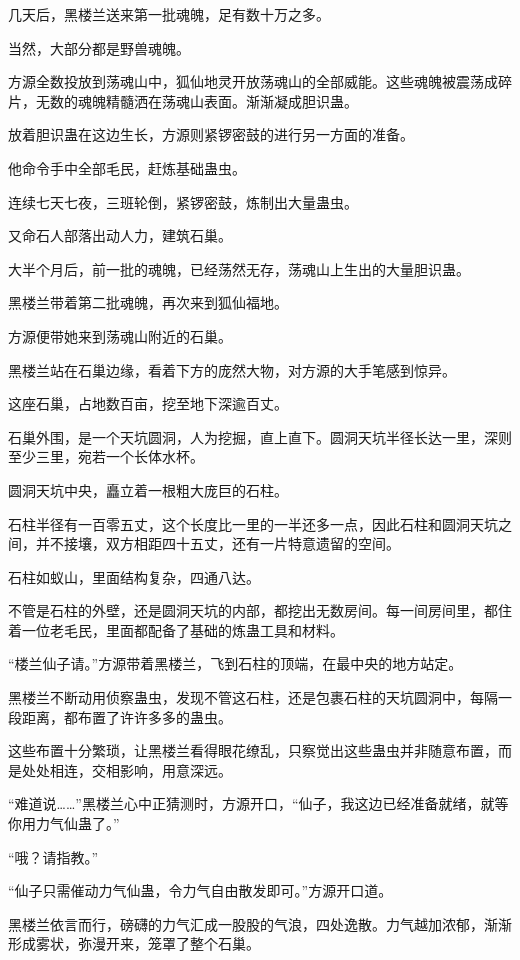\begin{this_body}
几天后，黑楼兰送来第一批魂魄，足有数十万之多。

当然，大部分都是野兽魂魄。

方源全数投放到荡魂山中，狐仙地灵开放荡魂山的全部威能。这些魂魄被震荡成碎片，无数的魂魄精髓洒在荡魂山表面。渐渐凝成胆识蛊。

放着胆识蛊在这边生长，方源则紧锣密鼓的进行另一方面的准备。

他命令手中全部毛民，赶炼基础蛊虫。

连续七天七夜，三班轮倒，紧锣密鼓，炼制出大量蛊虫。

又命石人部落出动人力，建筑石巢。

大半个月后，前一批的魂魄，已经荡然无存，荡魂山上生出的大量胆识蛊。

黑楼兰带着第二批魂魄，再次来到狐仙福地。

方源便带她来到荡魂山附近的石巢。

黑楼兰站在石巢边缘，看着下方的庞然大物，对方源的大手笔感到惊异。

这座石巢，占地数百亩，挖至地下深逾百丈。

石巢外围，是一个天坑圆洞，人为挖掘，直上直下。圆洞天坑半径长达一里，深则至少三里，宛若一个长体水杯。

圆洞天坑中央，矗立着一根粗大庞巨的石柱。

石柱半径有一百零五丈，这个长度比一里的一半还多一点，因此石柱和圆洞天坑之间，并不接壤，双方相距四十五丈，还有一片特意遗留的空间。

石柱如蚁山，里面结构复杂，四通八达。

不管是石柱的外壁，还是圆洞天坑的内部，都挖出无数房间。每一间房间里，都住着一位老毛民，里面都配备了基础的炼蛊工具和材料。

“楼兰仙子请。”方源带着黑楼兰，飞到石柱的顶端，在最中央的地方站定。

黑楼兰不断动用侦察蛊虫，发现不管这石柱，还是包裹石柱的天坑圆洞中，每隔一段距离，都布置了许许多多的蛊虫。

这些布置十分繁琐，让黑楼兰看得眼花缭乱，只察觉出这些蛊虫并非随意布置，而是处处相连，交相影响，用意深远。

“难道说……”黑楼兰心中正猜测时，方源开口，“仙子，我这边已经准备就绪，就等你用力气仙蛊了。”

“哦？请指教。”

“仙子只需催动力气仙蛊，令力气自由散发即可。”方源开口道。

黑楼兰依言而行，磅礴的力气汇成一股股的气浪，四处逸散。力气越加浓郁，渐渐形成雾状，弥漫开来，笼罩了整个石巢。


\end{this_body}

